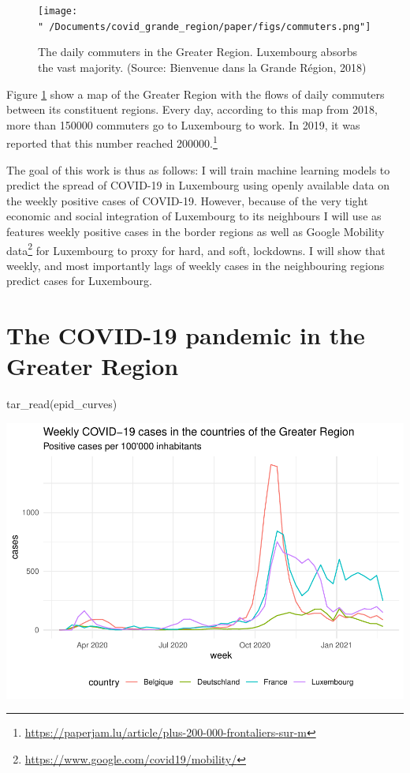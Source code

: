 \documentclass{article}
\newenvironment{Shaded}{\begin{snugshade}}{\end{snugshade}}
\newcommand{\FunctionTok}[1]{\textcolor[rgb]{0.00,0.00,0.00}{#1}}
\newcommand{\NormalTok}[1]{#1}
\begin{document}
\begin{figure}
  \centering
  \texttt{[image: "~/Documents/covid\_grande\_region/paper/figs/commuters.png"]}
  \caption{The daily commuters in the Greater Region. Luxembourg absorbs the vast majority. (Source: Bienvenue dans la Grande Région, 2018)}
  \label{commuters}
\end{figure}

Figure \ref{commuters} show a map of the Greater Region with the flows
of daily commuters between its constituent regions. Every day, according
to this map from 2018, more than 150000 commuters go to Luxembourg to
work. In 2019, it was reported that this number reached
200000.\footnote{\url{https://paperjam.lu/article/plus-200-000-frontaliers-sur-m}}

The goal of this work is thus as follows: I will train machine learning
models to predict the spread of COVID-19 in Luxembourg using openly
available data on the weekly positive cases of COVID-19. However,
because of the very tight economic and social integration of Luxembourg
to its neighbours I will use as features weekly positive cases in the
border regions as well as Google Mobility
data\footnote{\url{https://www.google.com/covid19/mobility/}} for
Luxembourg to proxy for hard, and soft, lockdowns. I will show that
weekly, and most importantly lags of weekly cases in the neighbouring
regions predict cases for Luxembourg.

\hypertarget{the-covid-19-pandemic-in-the-greater-region}{%
\section{The COVID-19 pandemic in the Greater
Region}\label{the-covid-19-pandemic-in-the-greater-region}}

\begin{Shaded}
\begin{Highlighting}[]
\FunctionTok{tar\_read}\NormalTok{(epid\_curves)}
\end{Highlighting}
\end{Shaded}

\includegraphics{paper_files/figure-latex/unnamed-chunk-1-1.pdf}
\end{document}

